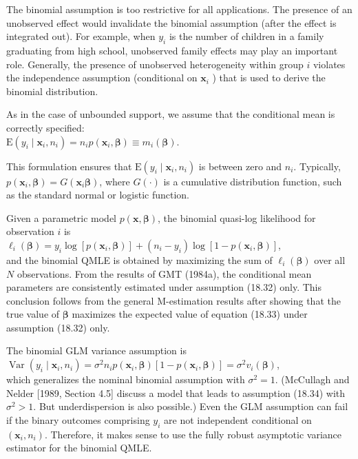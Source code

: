 \documentclass[10pt]{article}
\begin{document}
The binomial assumption is too restrictive for all applications. The presence of an unobserved effect would invalidate the binomial assumption (after the effect is integrated out). For example, when $y_{i}$ is the number of children in a family graduating from high school, unobserved family effects may play an important role. Generally, the presence of unobserved heterogeneity within group $i$ violates the independence assumption (conditional on $\mathbf{x}_{i}$ ) that is used to derive the binomial distribution.

As in the case of unbounded support, we assume that the conditional mean is correctly specified:\\
$\mathrm{E}\left(y_{i} \mid \mathbf{x}_{i}, n_{i}\right)=n_{i} p\left(\mathbf{x}_{i}, \boldsymbol{\beta}\right) \equiv m_{i}(\boldsymbol{\beta})$.

This formulation ensures that $\mathrm{E}\left(y_{i} \mid \mathbf{x}_{i}, n_{i}\right)$ is between zero and $n_{i}$. Typically, $p\left(\mathbf{x}_{i}, \boldsymbol{\beta}\right) =G\left(\mathbf{x}_{i} \boldsymbol{\beta}\right)$, where $G(\cdot)$ is a cumulative distribution function, such as the standard normal or logistic function.

Given a parametric model $p(\mathbf{x}, \boldsymbol{\beta})$, the binomial quasi-log likelihood for observation $i$ is\\
$\ell_{i}(\boldsymbol{\beta})=y_{i} \log \left[p\left(\mathbf{x}_{i}, \boldsymbol{\beta}\right)\right]+\left(n_{i}-y_{i}\right) \log \left[1-p\left(\mathbf{x}_{i}, \boldsymbol{\beta}\right)\right]$,\\
and the binomial QMLE is obtained by maximizing the sum of $\ell_{i}(\boldsymbol{\beta})$ over all $N$ observations. From the results of GMT (1984a), the conditional mean parameters are consistently estimated under assumption (18.32) only. This conclusion follows from the general M-estimation results after showing that the true value of $\boldsymbol{\beta}$ maximizes the expected value of equation (18.33) under assumption (18.32) only.

The binomial GLM variance assumption is\\
$\operatorname{Var}\left(y_{i} \mid \mathbf{x}_{i}, n_{i}\right)=\sigma^{2} n_{i} p\left(\mathbf{x}_{i}, \boldsymbol{\beta}\right)\left[1-p\left(\mathbf{x}_{i}, \boldsymbol{\beta}\right)\right]=\sigma^{2} v_{i}(\boldsymbol{\beta})$,\\
which generalizes the nominal binomial assumption with $\sigma^{2}=1$. (McCullagh and Nelder [1989, Section 4.5] discuss a model that leads to assumption (18.34) with $\sigma^{2}>1$. But underdispersion is also possible.) Even the GLM assumption can fail if the binary outcomes comprising $y_{i}$ are not independent conditional on $\left(\mathbf{x}_{i}, n_{i}\right)$. Therefore, it makes sense to use the fully robust asymptotic variance estimator for the binomial QMLE.
\end{document}
